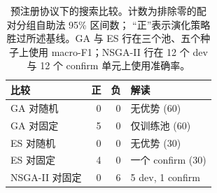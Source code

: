 \begin{table}[t]
\centering
\small
\caption{预注册协议下的搜索比较。计数为排除零的配对分组自助法 95\% 区间数；
“正”表示演化策略胜过所述基线。GA 与 ES 行在三个池、五个种子上使用
macro-F1；NSGA-II 行在 12 个 dev 与 12 个 confirm 单元上使用准确率。}
\label{tab:search}
\begin{tabular}{@{}lrrl@{}}
\toprule
比较 & 正 & 负 & 解读 \\
\midrule
GA 对随机 & 0 & 0 & 无优势 (60) \\
GA 对固定 & 5 & 0 & 仅训练池 (60) \\
ES 对随机 & 0 & 0 & 无优势 (30) \\
ES 对固定 & 4 & 0 & 一个 confirm (30) \\
NSGA-II 对固定 & 0 & 6 & 5 dev, 1 confirm \\
\bottomrule
\end{tabular}
\end{table}
